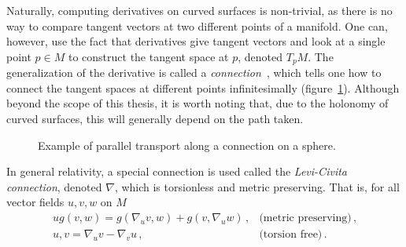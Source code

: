 Naturally, computing derivatives on curved surfaces is non-trivial, as there is no way to compare tangent vectors at two different points of a manifold. One can, however, use the fact that derivatives give tangent vectors and look at a single point $p\in M$ to construct the tangent space at $p$, denoted $T_pM$. The generalization of the derivative is called a \textit{connection}~\cite{baez_john_gauge_1994}, which tells one how to connect the tangent spaces at different points infinitesimally (figure~\ref{fig:parallel_transport}). Although beyond the scope of this thesis, it is worth noting that, due to the holonomy of curved surfaces, this will generally depend on the path taken.
\begin{figure}
    \centering
    \caption{Example of parallel transport along a connection on a sphere. }
    \label{fig:parallel_transport}
\end{figure}
In general relativity, a special connection is used called the \textit{Levi-Civita connection}, denoted $\nabla$, which is torsionless and metric preserving. That is, for all vector fields $u,v,w$ on $M$
\begin{equation}
    \begin{array}{lr}
        u g(v,w) = g(\nabla_u v, w)+g(v,\nabla_u w) \,, & \text{(metric preserving)} \,, \\
        u,v = \nabla_u v - \nabla_v u \,, & \text{(torsion free)}\,. \\
    \end{array}
\end{equation}

